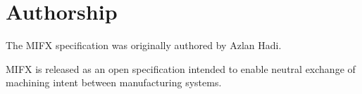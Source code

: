 \documentclass[11pt,a4paper]{article}
\begin{document}
\maketitle

\newpage
\section*{Authorship}

The MIFX specification was originally authored by Azlan Hadi.

MIFX is released as an open specification intended to enable neutral exchange of machining intent between manufacturing systems.

\newpage
\tableofcontents
\newpage


\newpage

\newpage

\newpage

\newpage

\newpage

\newpage

\newpage

\newpage

\newpage

\newpage

\newpage

\newpage



\appendix

\newpage


\newpage


\newpage


\newpage

\end{document}
